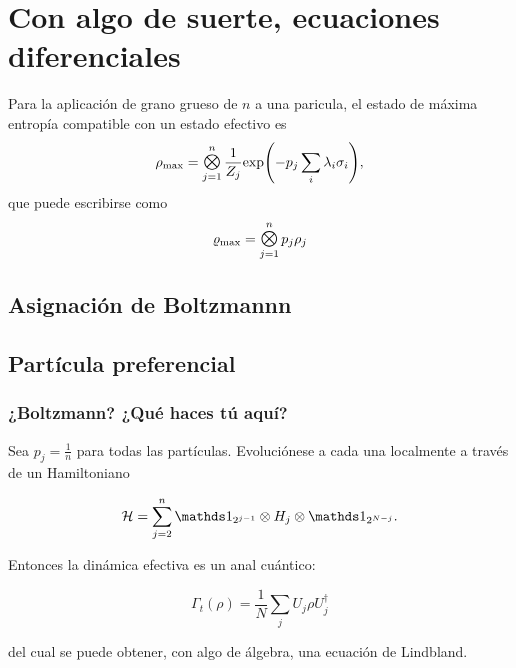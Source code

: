 \chapter{Con algo de suerte, ecuaciones diferenciales}

Para la aplicación de grano grueso de $n$ a una paricula, el estado de máxima entropía compatible con un estado efectivo es
\begin{equation}\label{eq:GeneralMaxEnt}
    \rho_{\max}=\Motimes_{j=1}^{n}\frac{1}{Z_{j}}\text{exp}\qty(-p_{j}\sum_{i}\lambda_{i}\sigma_{i}),
\end{equation}
que puede escribirse como
\begin{equation*}
    \varrho_{\max}=\Motimes_{j=1}^{n}p_{j}\rho_{j}
\end{equation*}

\section{Asignación de Boltzmannn}



\section{Partícula preferencial}

\subsection{¿Boltzmann? ¿Qué haces tú aquí?}

Sea $p_{j}=\frac{1}{n}$ para todas las partículas. Evoluciónese a cada una localmente a través de un Hamiltoniano

\begin{equation*}
    \mcH=\sum_{j=2}^{n}\Id_{2^{j-1}}\otimes H_{j} \otimes \Id_{2^{N-j}}.
\end{equation*}

Entonces la dinámica efectiva es un anal cuántico:

\begin{equation*}
    \Gamma_{t}(\rho)=\frac{1}{N}\sum_{j}U_{j}\rho U_{j}^{\dag}
\end{equation*}

del cual se puede obtener, con algo de álgebra, una ecuación de Lindbland.

